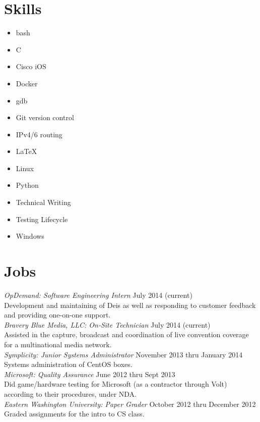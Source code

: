 \documentclass[line, margin]{res}
\begin{document}
\begin{resume}
	\section{Skills}
	\begin{multicols}{3}
		\begin{itemize}
			\item bash
			\item C
			\item Cisco iOS
			\item Docker
			\item gdb
			\item Git version control
			\item IPv4/6 routing
			\item \LaTeX
			\item Linux
			\item Python
			\item Technical Writing
			\item Testing Lifecycle
			\item Windows
		\end{itemize}
	\end{multicols}

	\section{Jobs}
	\textit{OpDemand: Software Engineering Intern} \hfill July 2014 (current) \\
	Development and maintaining of Deis as well as responding to customer
	feedback and providing one-on-one support. \\ [6pt]
	\textit{Bravery Blue Media, LLC: On-Site Technician} \hfill July 2014 (current) \\
	Assisted in the capture, broadcast and coordination of live convention
	coverage for a multinational media network. \\ [6pt]
	\textit{Symplicity: Junior Systems Administrator} \hfill November 2013 thru January 2014 \\
	Systems administration of CentOS boxes. \\ [6pt]
	\textit{Microsoft: Quality Assurance} \hfill June 2012 thru Sept 2013 \\
	Did game/hardware testing for Microsoft (as a contractor through Volt)
	according to their procedures, under NDA. \\ [6pt]
	\textit{Eastern Washington University: Paper Grader} \hfill October 2012 thru December 2012 \\
	Graded assignments for the intro to CS class. \\ [12pt]

\end{resume}
\end{document}
